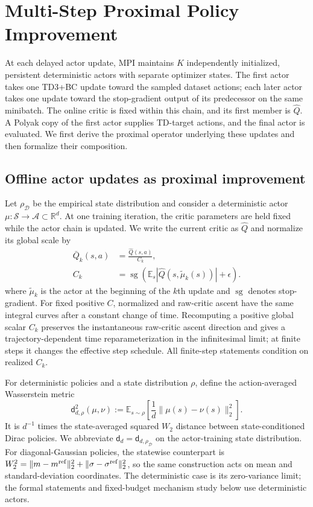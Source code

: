 \section{Multi-Step Proximal Policy Improvement}
\label{sec:method}

At each delayed actor update, MPI maintains $K$ independently initialized,
persistent deterministic actors with separate optimizer states. The first
actor takes one TD3+BC update toward the sampled dataset actions; each later
actor takes one update toward the stop-gradient output of its predecessor on
the same minibatch. The online critic is fixed within this chain, and its first
member is $\widehat Q$. A Polyak copy of the first actor supplies TD-target
actions, and the final actor is evaluated. We first derive the proximal
operator underlying these updates and then formalize their composition.
\subsection{Offline actor updates as proximal improvement}

Let $\rho_{\mathcal D}$ be the empirical state distribution and consider a
deterministic actor $\mu:\mathcal S\rightarrow\mathcal A\subset\mathbb R^d$.
At one training iteration, the critic parameters are held fixed while the actor
chain is updated. We write the current critic as $\widehat Q$ and normalize its
global scale by
\begin{equation}
\begin{aligned}
 \bar Q_k(s,a)&=\frac{\widehat Q(s,a)}{C_k},\\
 C_k&=\operatorname{sg}\!\left(
 \mathbb E_s|\widehat Q(s,\widetilde\mu_k(s))|+\epsilon\right).
\end{aligned}
\label{eq:qnorm}
\end{equation}
where $\widetilde\mu_k$ is the actor at the beginning of the $k$th update and
$\operatorname{sg}$ denotes stop-gradient. For fixed positive $C$, normalized
and raw-critic ascent have the same integral curves after a constant change of
time. Recomputing a positive global scalar $C_k$ preserves the instantaneous
raw-critic ascent direction and gives a trajectory-dependent time
reparameterization in the infinitesimal limit; at finite steps it changes the
effective step schedule. All finite-step statements condition on realized
$C_k$.

For deterministic policies and a state distribution $\rho$, define the
action-averaged Wasserstein metric
\begin{equation}
 \mathsf d_{d,\rho}^2(\mu,\nu)
 :=\mathbb E_{s\sim\rho}
 \left[\frac{1}{d}\|\mu(s)-\nu(s)\|_2^2\right].
 \label{eq:mean_metric}
\end{equation}
It is $d^{-1}$ times the state-averaged squared $W_2$ distance between
state-conditioned Dirac policies. We abbreviate
$\mathsf d_d=\mathsf d_{d,\rho_{\mathcal D}}$ on the actor-training state
distribution.
For diagonal-Gaussian policies, the statewise counterpart is
$W_2^2=\|m-m^{\rm ref}\|_2^2+\|\sigma-\sigma^{\rm ref}\|_2^2$, so the
same construction acts on mean and standard-deviation coordinates. The
deterministic case is its zero-variance limit; the formal statements and
fixed-budget mechanism study below use deterministic actors.


